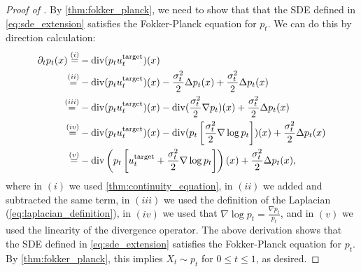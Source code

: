 \begin{proof}[Proof of ]
 By \cref{thm:fokker_planck}, we need to show that that the SDE defined in \cref{eq:sde_extension} satisfies the Fokker-Planck equation for $p_t$. We can do this by direction calculation:
\begin{align*}
    \partial_t p_t(x) \overset{(i)}{=}& - \mathrm{div}(p_tu^{\text{target}}_t)(x)\\
    \overset{(ii)}{=}& - \mathrm{div}(p_tu^{\text{target}}_t)(x) -\frac{\sigma_t^2}{2}\Delta p_t(x)+\frac{\sigma_t^2}{2}\Delta p_t(x)\\
    \overset{(iii)}{=}& - \mathrm{div}(p_tu^{\text{target}}_t)(x) -\mathrm{div}(\frac{\sigma_t^2}{2}\nabla p_t)(x)+\frac{\sigma_t^2}{2}\Delta p_t(x)\\
    \overset{(iv)}{=}& - \mathrm{div}(p_tu^{\text{target}}_t)(x) -\mathrm{div}(p_t\left[\frac{\sigma_t^2}{2}\nabla \log p_t\right])(x)+\frac{\sigma_t^2}{2}\Delta p_t(x)\\
    \overset{(v)}{=}&- \mathrm{div}\left(p_t\left[u^{\text{target}}_t+\frac{\sigma_t^2}{2}\nabla \log p_t\right]\right)(x)+\frac{\sigma_t^2}{2}\Delta p_t(x),
\end{align*}
where in $(i)$ we used \cref{thm:continuity_equation}, in $(ii)$ we added and subtracted the same term, in $(iii)$ we used the definition of the Laplacian (\cref{eq:laplacian_definition}), in $(iv)$ we used that $\nabla\log p_t=\frac{\nabla p_t}{p_t}$, and in $(v)$ we used the linearity of the divergence operator. The above derivation shows that the SDE defined in \cref{eq:sde_extension} satisfies the Fokker-Planck equation for $p_t$. By \cref{thm:fokker_planck}, this implies $X_t\sim p_t$ for $0\leq t\leq 1$, as desired.
\end{proof}


